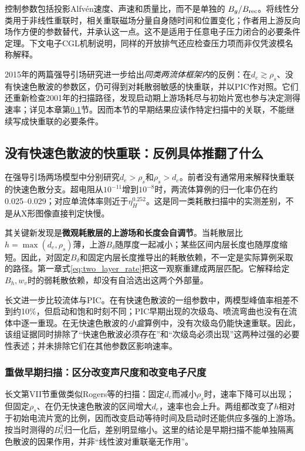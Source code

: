 控制参数包括投影Alfvén速度、声速和质量比，而不是单独的 $B_g/B_{\rm rec}$。将线性分类用于非线性重联时，相关重联磁场分量自身随时间和位置变化；作者用上游反向场作方便的参数替代，并承认这一点。这不是适用于任意电子压力闭合的必要条件定理。下文电子CGL机制说明，同样的开放排气还应检查压力项而非仅凭波模名称解释。

2015年的两篇强导引场研究进一步给出\emph{同类两流体框架内}的反例：在$d_e\gtrsim\rho_s$、没有快速色散波的参数区，仍可得到对耗散弱敏感的快重联，并以PIC作对照。它们还重新检查2001年的扫描路径，发现启动期上游场耗尽与初始片宽也参与决定测得速率；详见本章第\ref{sec:withoutfdw}节。因而本节的早期结果应读作特定扫描中的关联，不能继续写成快重联的必要条件。\citep{L216,L217}

\subsection{没有快速色散波的快重联：反例具体推翻了什么}\label{sec:withoutfdw}
\citet{L216}在强导引场两场模型中分别研究$d_e>\rho_s$和$\rho_s>d_e$。前者没有通常用来解释快重联的快速色散分支。超电阻从$10^{-11}$增到$10^{-8}$时，两流体算例的归一化率仍在约0.025--0.029；对应单流体率则近于$\eta_H^{0.252}$。这是同一类耗散扫描中的实测差别，不是从X形图像直接判定快慢。

其关键新发现是\textbf{微观耗散层的上游场和长度会自调节}。当耗散层比$h=\max(d_e,\rho_s)$薄，上游$B_\delta$随厚度一起减小；某些区间内层长度也随厚度缩短。因此，对固定$B_\delta$和固定内层长度推导出的耗散依赖，不一定是实际算例采取的路径。第一章式\eqref{eq:two_layer_rate}把这一观察重建成两层匹配。它解释给定$B_h,w_v$时的弱耗散依赖，却没有自洽选出这两个外部量。

长文\citet{L217}进一步比较流体与PIC。在有快速色散波的一组参数中，两模型峰值率相差不到约10\%，但启动和饱和时刻不同；PIC早期出现的次级岛、喷流弯曲也没有在流体中逐一重现。在无快速色散波的\emph{小盒}算例中，没有次级岛仍能快速重联。因此，该组证据同时排除了“快速色散波必须存在”和“次级岛必须出现”这两种过强的必要性表述；并未排除它们在其他参数区影响速率。

\subsubsection{重做早期扫描：区分改变声尺度和改变电子尺度}
长文第VII节重做类似Rogers等的扫描：固定$d_e$而减小$\rho_s$时，速率下降可以出现；但固定$\rho_s$、在仍无快速色散波的区间增大$d_e$，速率也会上升。两组都改变了$h$相对于初始电流片宽的比例，因而改变启动等待时间及启动时还能供应多强的上游场。按当时测得的$B_h^2$归一化后，差别明显缩小。这里的结论是早期扫描不能单独隔离色散波的因果作用，并非“线性波对重联毫无作用”。\citep{Rogers2001,L217}

